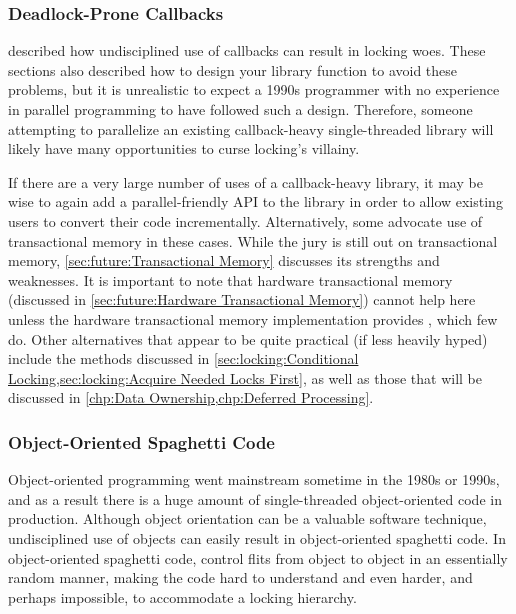 \subsubsection{Deadlock-Prone Callbacks}
\label{sec:locking:Deadlock-Prone Callbacks}

described how undisciplined use of callbacks can result in locking
woes.
These sections also described how to design your library function to
avoid these problems, but it is unrealistic to expect a 1990s programmer
with no experience in parallel programming to have followed such a design.
Therefore, someone attempting to parallelize an existing callback-heavy
single-threaded library will likely have many opportunities to curse
locking's villainy.

If there are a very large number of uses of a callback-heavy library,
it may be wise to again add a parallel-friendly API to the library in
order to allow existing users to convert their code incrementally.
Alternatively, some advocate use of transactional memory in these cases.
While the jury is still out on transactional memory,
\cref{sec:future:Transactional Memory} discusses its strengths and
weaknesses.
It is important to note that hardware transactional memory
(discussed in
\cref{sec:future:Hardware Transactional Memory})
cannot help here unless the hardware transactional memory implementation
provides , which few do.
Other alternatives that appear to be quite practical (if less heavily
hyped) include the methods discussed in
\cref{sec:locking:Conditional Locking,sec:locking:Acquire Needed Locks First},
as well as those that will be discussed in
\cref{chp:Data Ownership,chp:Deferred Processing}.

\subsubsection{Object-Oriented Spaghetti Code}
\label{sec:locking:Object-Oriented Spaghetti Code}

Object-oriented programming went mainstream sometime in the 1980s or
1990s, and as a result there is a huge amount of single-threaded
object-oriented code in production.
Although object orientation can be a valuable software technique,
undisciplined use of objects can easily result in object-oriented
spaghetti code.
In object-oriented spaghetti code, control flits from object to object
in an essentially random manner, making the code hard to understand
and even harder, and perhaps impossible, to accommodate a locking hierarchy.

